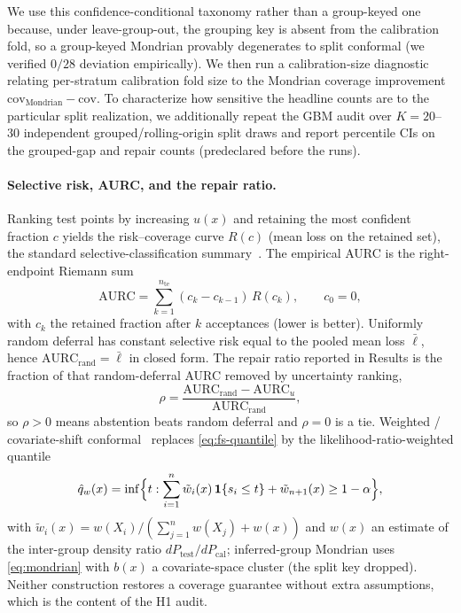 \documentclass[pdflatex,sn-mathphys-num]{sn-jnl}
\begin{document}
We use this confidence-conditional taxonomy rather than a group-keyed one because, under leave-group-out, the grouping key
is absent from the calibration fold, so a group-keyed Mondrian provably degenerates to split conformal (we
verified $0/28$ deviation empirically). We then run a calibration-size diagnostic relating per-stratum
calibration fold size to the Mondrian coverage improvement $\mathrm{cov}_{\mathrm{Mondrian}}-\mathrm{cov}$.
To characterize how sensitive the headline
counts are to the particular split realization, we additionally repeat the GBM audit over $K{=}20$--$30$
independent grouped/rolling-origin split draws and report percentile CIs on the grouped-gap and repair counts
(predeclared before the runs). 
\paragraph{Selective risk, AURC, and the repair ratio.}
Ranking test points by increasing $u(x)$ and retaining the most confident fraction $c$ yields the risk--coverage curve $R(c)$ (mean loss on the retained set), the standard selective-classification summary~\citep{elyaniv2010selective,geifman2017selective}. The empirical AURC is the right-endpoint Riemann sum
\begin{equation}
\label{eq:aurc}
\mathrm{AURC}
=\sum_{k=1}^{n_{\mathrm{te}}}(c_k-c_{k-1})\,R(c_k),
\qquad c_0=0,
\end{equation}
with $c_k$ the retained fraction after $k$ acceptances (lower is better). Uniformly random deferral has constant selective risk equal to the pooled mean loss $\bar\ell$, hence $\mathrm{AURC}_{\mathrm{rand}}=\bar\ell$ in closed form. The repair ratio reported in Results is the fraction of that random-deferral AURC removed by uncertainty ranking,
\begin{equation}
\label{eq:repair-ratio}
\rho
=\frac{\mathrm{AURC}_{\mathrm{rand}}-\mathrm{AURC}_{u}}{\mathrm{AURC}_{\mathrm{rand}}},
\end{equation}
so $\rho>0$ means abstention beats random deferral and $\rho=0$ is a tie.
Weighted / covariate-shift conformal~\citep{tibshirani2019covariate} replaces \eqref{eq:fs-quantile} by the likelihood-ratio-weighted quantile
\begin{equation}
\label{eq:weighted-cp}
\hat q_w(x)
=\inf\Bigl\{t:
\sum_{i=1}^{n}\tilde w_i(x)\,\mathbf{1}\{s_i\le t\}+\tilde w_{n+1}(x)\ge 1-\alpha\Bigr\},
\end{equation}
with $\tilde w_i(x)=w(X_i)/(\sum_{j=1}^{n}w(X_j)+w(x))$ and $w(x)$ an estimate of the inter-group density ratio $dP_{\mathrm{test}}/dP_{\mathrm{cal}}$; inferred-group Mondrian uses \eqref{eq:mondrian} with $b(x)$ a covariate-space cluster (the split key dropped). Neither construction restores a coverage guarantee without extra assumptions, which is the content of the H1 audit.
\end{document}
